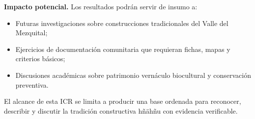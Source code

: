 \textbf{Impacto potencial.}
Los resultados podrán servir de insumo a:

\begin{itemize}
	\item Futuras investigaciones sobre construcciones tradicionales del Valle del Mezquital;
	\item Ejercicios de documentación comunitaria que requieran fichas, mapas y criterios básicos;
	\item Discusiones académicas sobre patrimonio vernáculo biocultural y conservación preventiva.
\end{itemize}

El alcance de esta ICR se limita a producir una base ordenada para reconocer, describir y discutir la tradición constructiva hñähñu con evidencia verificable.
